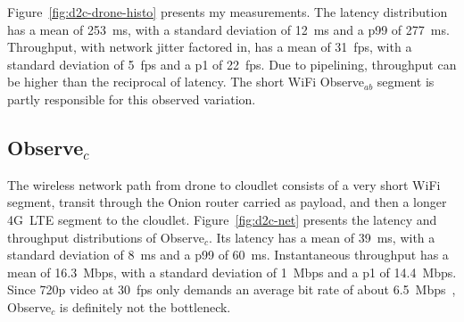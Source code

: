 Figure~\ref{fig:d2c-drone-histo} presents my measurements.  The
latency distribution has a mean of 253~ms, with a standard deviation
of 12~ms and a p99 of 277~ms.  Throughput, with network jitter factored in, has a mean of
31~fps, with a standard deviation of 5~fps and a p1 of 22~fps.  Due to
pipelining, throughput can be higher than the reciprocal of latency.
The short WiFi Observe$_{ab}$ segment is partly responsible for this observed variation.

\subsection{Observe$_c$}
\label{sec:netdownlink}

The wireless network path
from drone to cloudlet consists of a very short WiFi segment, transit
through the Onion router carried as payload, and then a longer 4G~LTE
segment to the cloudlet.  Figure~\ref{fig:d2c-net} presents the
latency and throughput distributions of Observe$_c$.  Its latency has
a mean of 39~ms, with a standard deviation of 8~ms and a p99 of 60~ms.
Instantaneous throughput has a mean of 16.3~Mbps, with a standard
deviation of 1~Mbps and a p1 of 14.4~Mbps.  Since 720p video at 30~fps
only demands an average bit rate of about 6.5~Mbps~\cite{Adobe2024},
Observe$_c$ is definitely not the bottleneck.

